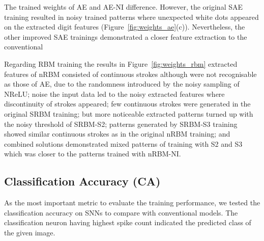 The trained weights of AE and AE-NI \protect{} \protect{} difference.
However, the original SAE training resulted in noisy trained patterns where unexpected white dots appeared on the extracted digit features (Figure~\ref{fig:weights_ae}(c)).
Nevertheless, the other improved SAE trainings demonstrated a closer feature extraction to the conventional \protect{} \protect{}



Regarding RBM training
the results in Figure~\ref{fig:weights_rbm} \protect{} \protect{}
extracted features of \protect{} nRBM \protect{} consisted of continuous strokes although \protect{} were not \protect{} recognisable as those of \protect{} AE, due to the randomness introduced by the noisy sampling of NReLU;
\protect{} noise \protect{} \protect{} the input data led to the noisy extracted features where discontinuity of strokes appeared;
few continuous strokes were generated in the original SRBM training;
but more noticeable extracted patterns turned up with the \protect{} noisy threshold \protect{} of SRBM-S2;
patterns generated by SRBM-S3 training showed similar continuous strokes as in the original nRBM training;
and combined solutions demonstrated mixed patterns of training with S2 and S3 which was closer to the patterns trained with nRBM-NI. 


\subsection{Classification Accuracy (CA)}
As the most important metric to evaluate the training performance, we tested the classification accuracy on SNNs to compare with conventional models.
The classification neuron having \protect{} \protect{} highest spike count indicated the predicted class of the given image.

